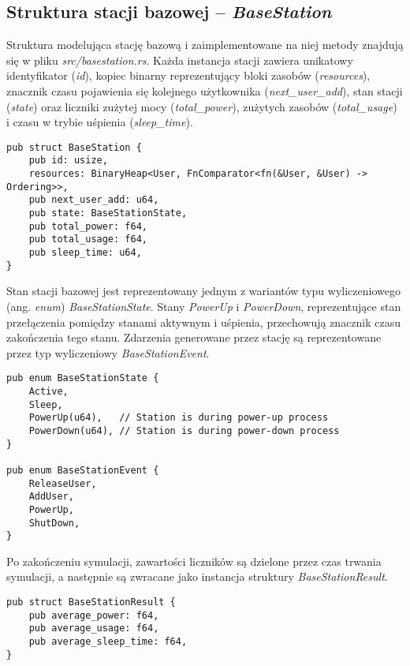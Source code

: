 \subsection{Struktura stacji bazowej -- \emph{BaseStation}}
Struktura modelująca stację bazową i zaimplementowane na niej metody znajdują się w pliku \emph{src/basestation.rs}. Każda instancja stacji zawiera unikatowy identyfikator (\emph{id}), kopiec binarny reprezentujący bloki zasobów (\emph{resources}), znacznik czasu pojawienia się kolejnego użytkownika (\emph{next\_user\_add}), stan stacji (\emph{state}) oraz liczniki zużytej mocy (\emph{total\_power}), zużytych zasobów (\emph{total\_usage}) i czasu w trybie uśpienia (\emph{sleep\_time}).

{
\selectfont 
\begin{verbatim}
pub struct BaseStation {
    pub id: usize,
    resources: BinaryHeap<User, FnComparator<fn(&User, &User) -> Ordering>>,
    pub next_user_add: u64,
    pub state: BaseStationState,
    pub total_power: f64,
    pub total_usage: f64,
    pub sleep_time: u64,
}
\end{verbatim}
}

\noindent Stan stacji bazowej jest reprezentowany jednym z wariantów typu wyliczeniowego (ang. \emph{enum}) \emph{BaseStationState}. Stany \emph{PowerUp} i \emph{PowerDown}, reprezentujące stan przełączenia pomiędzy stanami aktywnym i uśpienia, przechowują znacznik czasu zakończenia tego stanu. Zdarzenia generowane przez stację są reprezentowane przez typ wyliczeniowy \emph{BaseStationEvent}.
{
\selectfont 
\begin{verbatim}
pub enum BaseStationState {
    Active,
    Sleep,
    PowerUp(u64),   // Station is during power-up process
    PowerDown(u64), // Station is during power-down process
}

pub enum BaseStationEvent {
    ReleaseUser,
    AddUser,
    PowerUp,
    ShutDown,
}
\end{verbatim}
}

\noindent Po zakończeniu symulacji, zawartości liczników są dzielone przez czas trwania symulacji, a następnie są zwracane jako instancja struktury \emph{BaseStationResult}.
{
\selectfont 
\begin{verbatim}
pub struct BaseStationResult {
    pub average_power: f64,
    pub average_usage: f64,
    pub average_sleep_time: f64,
}
\end{verbatim}
}

